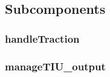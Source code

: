 \subsection{Subcomponents}\label{s:manageTIUOutput_subcomponents}

\subsubsection{handleTraction}


\subsubsection{manageTIU\_output}
